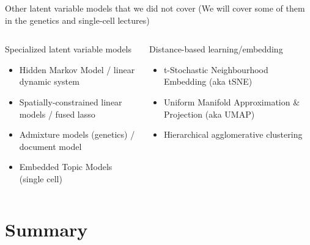 \documentclass[
  ignorenonframetext,
  aspectratio=169]{beamer}
\begin{document}
\begin{frame}{Other latent variable models that we did not cover}
\protect\hypertarget{other-latent-variable-models-that-we-did-not-cover}{}
(We will cover some of them in the genetics and single-cell lectures)

\begin{columns}[T]
\begin{column}{.45\textwidth}
\begin{block}{Specialized latent variable models}
\protect\hypertarget{specialized-latent-variable-models}{}
\begin{itemize}
\item
  Hidden Markov Model / linear dynamic system
\item
  Spatially-constrained linear models / fused lasso
\item
  Admixture models (genetics) / document model
\item
  Embedded Topic Models (single cell)
\end{itemize}
\end{block}
\end{column}

\begin{column}{.45\textwidth}
\begin{block}{Distance-based learning/embedding}
\protect\hypertarget{distance-based-learningembedding}{}
\begin{itemize}
\item
  t-Stochastic Neighbourhood Embedding (aka tSNE)
\item
  Uniform Manifold Approximation \& Projection (aka UMAP)
\item
  Hierarchical agglomerative clustering
\end{itemize}
\end{block}
\end{column}
\end{columns}
\end{frame}

\hypertarget{summary}{%
\section{Summary}\label{summary}}
\end{document}
